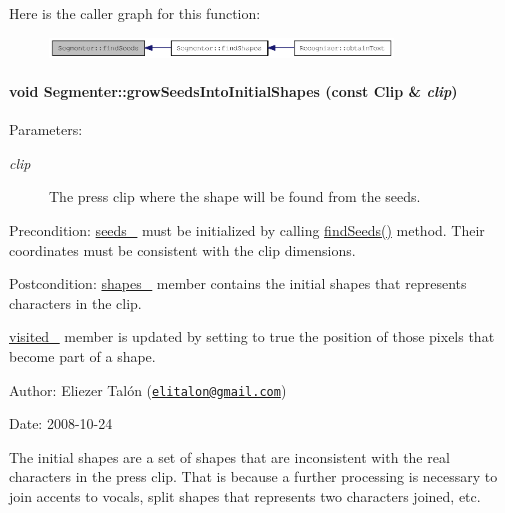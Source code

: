 Here is the caller graph for this function:\nopagebreak
\begin{figure}[H]
\begin{center}
\leavevmode
\includegraphics[width=259pt]{class_segmenter_bacab187b543a51c5322c01fc0a29ffb_icgraph}
\end{center}
\end{figure}
\hypertarget{class_segmenter_72c007e345fad7abbf6e9d4edb615a50}{
\paragraph[growSeedsIntoInitialShapes]{\setlength{\rightskip}{0pt plus 5cm}void Segmenter::growSeedsIntoInitialShapes (const {\bf Clip} \& {\em clip})}\hfill}
\label{class_segmenter_72c007e345fad7abbf6e9d4edb615a50}


\begin{Desc}
\item[Parameters:]
\begin{description}
\item[{\em clip}]The press clip where the shape will be found from the seeds.\end{description}
\end{Desc}
\begin{Desc}
\item[Precondition:]\hyperlink{class_segmenter_7859d050250b9fdf7c96374f80008d6e}{seeds\_\-} must be initialized by calling \hyperlink{class_segmenter_bacab187b543a51c5322c01fc0a29ffb}{findSeeds()} method. Their coordinates must be consistent with the clip dimensions.\end{Desc}
\begin{Desc}
\item[Postcondition:]\hyperlink{class_segmenter_41b94ede2829063e0937dc150756e77e}{shapes\_\-} member contains the initial shapes that represents characters in the clip. 

\hyperlink{class_segmenter_fe4dd18749f268aae2b26a1abff6a607}{visited\_\-} member is updated by setting to true the position of those pixels that become part of a shape.\end{Desc}
\begin{Desc}
\item[Author:]Eliezer Talón (\href{mailto:elitalon@gmail.com}{\tt elitalon@gmail.com}) \end{Desc}
\begin{Desc}
\item[Date:]2008-10-24\end{Desc}
The initial shapes are a set of shapes that are inconsistent with the real characters in the press clip. That is because a further processing is necessary to join accents to vocals, split shapes that represents two characters joined, etc.

